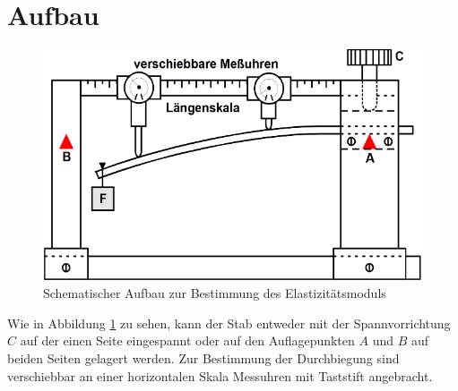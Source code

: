 \section{Aufbau}
\label{sec:Aufbau}
\begin{figure}
	\centering
	\includegraphics[width=\linewidth-70pt,height=\textheight-70pt,keepaspectratio]{content/images/Aufbau.png}
	\caption{Schematischer Aufbau zur Bestimmung des Elastizitätsmoduls\cite{V103}}
	\label{fig:Aufbau}
\end{figure}
Wie in Abbildung \ref{fig:Aufbau} zu sehen, kann der Stab entweder mit der Spannvorrichtung $C$ auf der einen Seite eingespannt oder auf den Auflagepunkten $A$ und $B$ auf beiden Seiten gelagert werden.
Zur Bestimmung der Durchbiegung sind verschiebbar an einer horizontalen Skala Messuhren mit Taststift angebracht.
